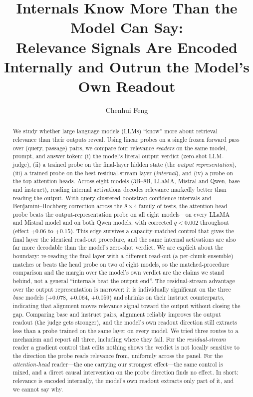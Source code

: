 \documentclass[11pt]{article}
\title{\textbf{Internals Know More Than the Model Can Say:\\
Relevance Signals Are Encoded Internally and Outrun the Model's Own Readout}}
\author{Chenhui Feng}
\affil{Nanjing University of Aeronautics and Astronautics}
\date{}
\begin{document}
\maketitle

\begin{abstract}
We study whether large language models (LLMs) ``know'' more about retrieval
relevance than their outputs reveal. Using linear probes on a single
frozen forward pass over (query, passage) pairs, we compare four
relevance \emph{readers} on the same model, prompt, and answer token:
(i) the model's literal output verdict (zero-shot LLM-judge), (ii) a trained
probe on the final-layer hidden state (the \emph{output representation}),
(iii) a trained probe on the best residual-stream layer (\emph{internal}),
and (iv) a probe on the top attention heads. Across eight models (3B--8B,
LLaMA, Mistral and Qwen, base and instruct), reading internal activations decodes
relevance markedly better than reading the output. With query-clustered
bootstrap confidence intervals and Benjamini--Hochberg correction across the
$8\times4$ family of tests, the attention-head probe beats the
output-representation probe on all eight models---on every LLaMA and Mistral
model and on both Qwen models, with corrected $q<0.002$ throughout
(effect $+0.06$ to $+0.15$). This edge survives a capacity-matched control
that gives the final layer the identical read-out procedure, and the same
internal activations are also far more decodable than the model's zero-shot
verdict. We are explicit about the boundary: re-reading the final layer with a
different read-out (a per-chunk ensemble) matches or beats the head probe on
two of eight models, so the matched-procedure comparison and the margin over
the model's own verdict are the claims we stand behind, not a general
``internals beat the output end''. The residual-stream advantage over the
output representation is narrower: it is individually significant on the three
\emph{base} models
($+0.078$, $+0.064$, $+0.059$) and shrinks on their instruct counterparts,
indicating that alignment moves relevance signal toward the output without
closing the gap. Comparing base and instruct pairs, alignment reliably
improves the output readout (the judge gets stronger), and the model's own
readout direction still extracts less than a probe trained on the same layer on
every model. We tried three routes to a mechanism and report all three,
including where they fail. For the \emph{residual-stream} reader a gradient
control that edits nothing shows the verdict is not locally sensitive to the
direction the probe reads relevance from, uniformly across the panel. For the
\emph{attention-head} reader---the one carrying our strongest effect---the same
control is mixed, and a direct causal intervention on the probe direction finds
no effect. In short: relevance is encoded internally, the model's own readout
extracts only part of it, and we cannot say why.
\end{abstract}
\end{document}
